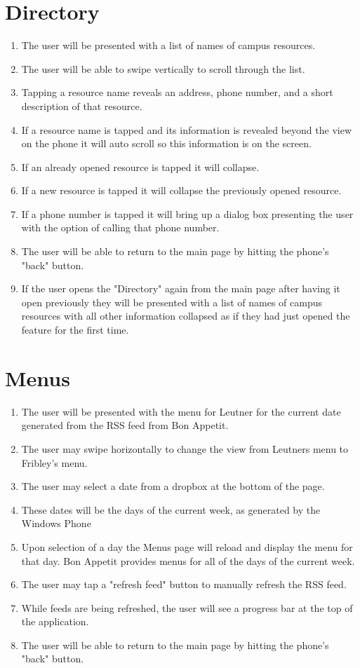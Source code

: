 \documentclass[pdftex,12pt,letter]{article}
\begin{document}
\section{Directory}
\begin{enumerate}[1.]
\item The user will be presented with a list of names of campus resources.
\item The user will be able to swipe vertically to scroll through the list.
\item Tapping a resource name reveals an address, phone number, and a short description of that resource.
\item If a resource name is tapped and its information is revealed beyond the view on the phone it will auto scroll so this information is on the screen.
\item If an already opened resource is tapped it will collapse.
\item If a new resource is tapped it will collapse the previously opened resource.
\item If a phone number is tapped it will bring up a dialog box presenting the user with the option of calling that phone number.
\item The user will be able to return to the main page by hitting the phone's "back" button.
\item  If the user opens the "Directory" again from the main page after having it open previously they will be presented with a list of names of campus resources with all other information collapsed as if they had just opened the feature for the first time.
\end{enumerate}
\section{Menus}
\begin{enumerate}[1.]
\item The user will be presented with the menu for Leutner for the current date generated from the RSS feed from Bon Appetit. 
\item The user may swipe horizontally to change the view from Leutners menu to Fribley's menu.
\item The user may select a date from a dropbox at the bottom of the page.
\item These dates will be the days of the current week, as generated by the Windows Phone
\item Upon selection of a day the Menus page will reload and display the menu for that day. Bon Appetit provides menus for all of the days of the current week.
\item The user may tap a "refresh feed" button to manually refresh the RSS feed.
\item While feeds are being refreshed, the user will see a progress bar at the top of the application.
\item The user will be able to return to the main page by hitting the phone's "back" button.
\end{enumerate}
\end{document}
